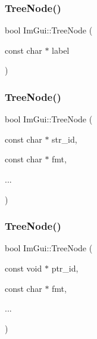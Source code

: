 \mbox{\label{namespace_im_gui_a4dff507ce8bbe0da9556bb50b1e60d7f}} 
\subsubsection{\texorpdfstring{Tree\+Node()}{TreeNode()}\hspace{0.1cm}{\footnotesize\ttfamily [1/3]}}
{\footnotesize\ttfamily bool Im\+Gui\+::\+Tree\+Node (\begin{DoxyParamCaption}\item[{const char $\ast$}]{label }\end{DoxyParamCaption})}

\mbox{\label{namespace_im_gui_a6e6e4de20291002430854cbd8cd58843}} 
\subsubsection{\texorpdfstring{Tree\+Node()}{TreeNode()}\hspace{0.1cm}{\footnotesize\ttfamily [2/3]}}
{\footnotesize\ttfamily bool Im\+Gui\+::\+Tree\+Node (\begin{DoxyParamCaption}\item[{const char $\ast$}]{str\+\_\+id,  }\item[{const char $\ast$}]{fmt,  }\item[{}]{... }\end{DoxyParamCaption})}

\mbox{\label{namespace_im_gui_a47f1421323f90fdd0a9cbfea2338b10f}} 
\subsubsection{\texorpdfstring{Tree\+Node()}{TreeNode()}\hspace{0.1cm}{\footnotesize\ttfamily [3/3]}}
{\footnotesize\ttfamily bool Im\+Gui\+::\+Tree\+Node (\begin{DoxyParamCaption}\item[{const void $\ast$}]{ptr\+\_\+id,  }\item[{const char $\ast$}]{fmt,  }\item[{}]{... }\end{DoxyParamCaption})}

